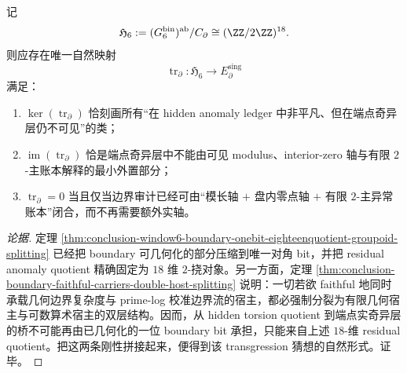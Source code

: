 \begin{conjecture}\label{conj:conclusion-window6-hidden-anomaly-quotient-endpoint-transgression}
记
\[
\mathfrak H_6:=(G_6^{\mathrm{bin}})^{\mathrm{ab}}/C_{\partial}\cong (\ZZ/2\ZZ)^{18}.
\]
则应存在唯一自然映射
\[
\operatorname{tr}_{\partial}:\mathfrak H_6\longrightarrow E_{\partial}^{\mathrm{sing}}
\]
满足：
\begin{enumerate}
  \item \(\ker(\operatorname{tr}_{\partial})\) 恰刻画所有“在 hidden anomaly ledger 中非平凡、但在端点奇异层仍不可见”的类；
  \item \(\operatorname{im}(\operatorname{tr}_{\partial})\) 恰是端点奇异层中不能由可见 modulus、interior-zero 轴与有限 \(2\)-主账本解释的最小外置部分；
  \item \(\operatorname{tr}_{\partial}=0\) 当且仅当边界审计已经可由“模长轴 \(+\) 盘内零点轴 \(+\) 有限 \(2\)-主异常账本”闭合，而不再需要额外实轴。
\end{enumerate}
\end{conjecture}
\begin{proof}[论据]
定理 \ref{thm:conclusion-window6-boundary-onebit-eighteenquotient-groupoid-splitting} 已经把 boundary 可几何化的部分压缩到唯一对角 bit，并把 residual anomaly quotient 精确固定为 \(18\) 维 \(2\)-挠对象。另一方面，定理 \ref{thm:conclusion-boundary-faithful-carriers-double-host-splitting} 说明：一切若欲 faithful 地同时承载几何边界复杂度与 prime-log 校准边界流的宿主，都必强制分裂为有限几何宿主与可数算术宿主的双层结构。因而，从 hidden torsion quotient 到端点实奇异层的桥不可能再由已几何化的一位 boundary bit 承担，只能来自上述 \(18\)-维 residual quotient。把这两条刚性拼接起来，便得到该 transgression 猜想的自然形式。证毕。
\end{proof}

